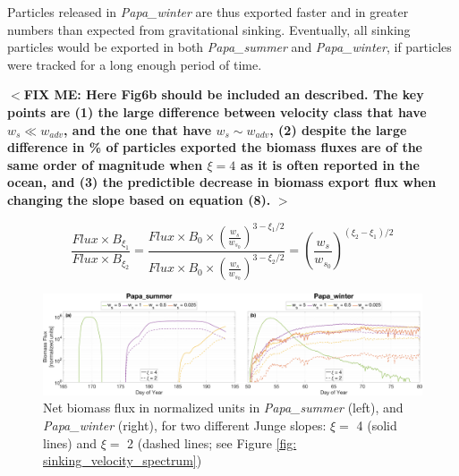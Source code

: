 \documentclass[draft,linenumbers]{agujournal2018}
\newcommand{\fixme}[1]{\color{red}$<$\textbf{FIX ME: #1}$>$\color{black}}
\begin{document}

Particles released in \textit{Papa\_winter} are thus exported faster and in greater numbers than expected from gravitational sinking. Eventually, all sinking particles would be exported in both \textit{Papa\_summer} and \textit{Papa\_winter}, if particles were tracked for a long enough period of time. 

\fixme{Here Fig6b should be included an described. The key points are (1) the large difference between velocity class that have $w_s\ll w_{adv}$, and the one that have $w_s\sim w_{adv}$, (2) despite the large difference in \% of particles exported the biomass fluxes are of the same order of magnitude when $\xi=4$ as it is often reported in the ocean, and (3) the predictible decrease in biomass export flux when changing the slope based on equation (8). }

\begin{equation}
    \frac{Flux\times B_{\xi_1}}{Flux\times B_{\xi_2}} = \frac{Flux \times B_0 \times \left(\frac{w_s}{w_s_0}\right)^{3-\xi_1/2}}{Flux \times B_0 \times \left(\frac{w_s}{w_s_0}\right)^{3-\xi_2/2}} = \left(\frac{w_s}{w_s_0}\right)^{(\xi_2-\xi_1)/2}
\end{equation}

\begin{figure}[ht]
	\centering
	\includegraphics[width = 1\linewidth]{figures/Fig6b_biomass_export_flux.png}
	\caption{Net biomass flux in normalized units in \textit{Papa\_summer} (left), and \textit{Papa\_winter} (right), for two different Junge slopes: $\xi =$ 4 (solid lines) and $\xi =$ 2 (dashed lines; see Figure \ref{fig: sinking_velocity_spectrum})}
	\label{fig: biomass_export}
\end{figure}
\end{document}
